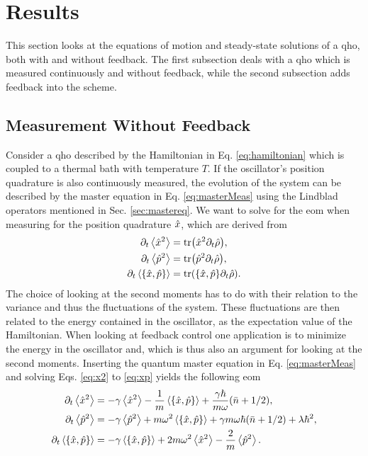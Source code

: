 \section{Results}
This section looks at the equations of motion and steady-state solutions of a \gls{qho}, both with and without feedback. The first subsection deals with a \gls{qho} which is measured continuously and without feedback, while the second subsection adds feedback into the scheme.
\subsection{Measurement Without Feedback}
Consider a \gls{qho} described by the Hamiltonian in Eq. \eqref{eq:hamiltonian} which is coupled to a thermal bath with temperature $T$. If the oscillator's position quadrature is also continuously measured, the evolution of the system can be described by the master equation in Eq. \eqref{eq:masterMeas} using the Lindblad operators mentioned in Sec. \ref{sec:mastereq}. We want to solve for the \gls{eom} when measuring for the position quadrature $\hat{x}$, which are derived from
\begin{align}
    \dt\expval{\xop^2} &= \tr(\xop^2 \dt \dmatrix)\label{eq:x2}, \\
    \dt\expval{\pop^2} &= \tr(\pop^2 \dt \dmatrix)\label{eq:p2},\\
    \dt\expval{\acomm{\xop}{\pop}} &= \tr(\acomm{\xop}{\pop} \dt \dmatrix). \label{eq:xp}
\end{align}
The choice of looking at the second moments has to do with their relation to the variance and thus the fluctuations of the system. These fluctuations are then related to the energy contained in the oscillator, as the expectation value of the Hamiltonian. When looking at feedback control one application is to minimize the energy in the oscillator and, which is thus also an argument for looking at the second moments. Inserting the quantum master equation in Eq. \eqref{eq:masterMeas} and solving Eqs. \eqref{eq:x2} to \eqref{eq:xp} yields the following \gls{eom}
\begin{align}
    \dt\expval{\xop^2} &= - \gamma \expval{\xop^2} - \frac{1}{m}\expval{\acomm{\xop}{\pop}} + \frac{\gamma \hbar}{m\omega}(\nbar + 1/2),\\
    \dt\expval{\pop^2} &= -\gamma \expval{\pop^2} + m\omega^2 \expval{\acomm{\xop}{\pop}} + \gamma m \omega\hbar (\nbar + 1/2) + \lambda \hbar^2,\\
    \dt\expval{\acomm{\xop}{\pop}} &= -\gamma \expval{\acomm{\xop}{\pop}} + 2 m \omega^2 \expval{\xop^2} - \frac{2}{m} \expval{\pop^2}.
\end{align}
